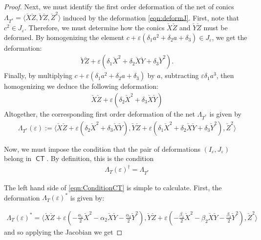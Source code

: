 \documentclass[reqno, 11pt]{amsart}
\theoremstyle{plain}
\theoremstyle{remark}
\DeclareMathOperator{\CT}{\mathsf{CT}}
\begin{document}
\begin{proof}
Next, we must identify the first order deformation of the net of
conics $\Lambda_{T^{*}} = \langle \check{X}\check{Z}, \check{Y}\check{Z}, \check{Z}^{2} \rangle$ induced by
the deformation \eqref{eqn:deformJ}.  First, note that
$c^{2} \in J_{\varepsilon}$. Therefore, we must determine how the
conics $\check{X}\check{Z}$ and $\check{Y}\check{Z}$ must be deformed.  By homogenizing the element
$c + \varepsilon(\delta_{1}a^{2}+\delta_{2}a + \delta_{3}) \in
J_{\varepsilon}$, we get the deformation:
\begin{eqnarray*}
  \check{Y}\check{Z} + \varepsilon(\delta_{1}\check{X}^{2}+\delta_{2}\check{X}\check{Y} + \delta_{3}\check{Y}^{2}).
\end{eqnarray*}
Finally, by multiplying
$c + \varepsilon(\delta_{1}a^{2}+\delta_{2}a + \delta_{3})$ by $a$,
subtracting $\varepsilon \delta_{1} a^{3}$, then homogenizing we
deduce the following deformation:
\begin{eqnarray*}
  \check{X}\check{Z} + \varepsilon(\delta_{2}\check{X}^{2} + \delta_{3}\check{X}\check{Y})
\end{eqnarray*} Altogether, the corresponding first order deformation of the net $\Lambda_{T^{*}}$ is given by  
\begin{eqnarray}
  \label{deformLambdaprime}
  \Lambda_{T^{*}}(\varepsilon) := \langle \check{X}\check{Z} + \varepsilon(\delta_{2}\check{X}^{2} + \delta_{3}\check{X}\check{Y}), \check{Y}\check{Z} + \varepsilon(\delta_{1}\check{X}^{2}+\delta_{2}\check{X}\check{Y} + \delta_{3}\check{Y}^{2}), \check{Z}^{2} \rangle 
\end{eqnarray}

Now, we must impose the condition that the pair of deformations
$(I_{\varepsilon}, J_{\varepsilon})$ belong in $\CT$. By definition,
this is the condition
\begin{eqnarray}\label{eqn:ConditionCT}
  \Lambda_{T}(\varepsilon)^{\dagger} = \Lambda_{T^{*}}
\end{eqnarray}


The left hand side of \eqref{eqn:ConditionCT} is simple to calculate.  First, the deformation $\Lambda_{T}(\varepsilon)^{*}$ is given by: 

\begin{eqnarray*}
  \Lambda_{T}(\varepsilon)^{*} = \langle \check{X}\check{Z} + \varepsilon(-\frac{\alpha_{1}}{2} \check{X}^{2} - \alpha_{2}\check{X}\check{Y} - \frac{\alpha_{3}}{2} \check{Y}^{2}), \check{Y}\check{Z} + \varepsilon(-\frac{\beta_{1}}{2} \check{X}^{2}-\beta_{2}\check{X}\check{Y} - \frac{\beta_{3}}{2} \check{Y}^{2}), \check{Z}^{2} \rangle
\end{eqnarray*}
and so applying the Jacobian we get 


\end{proof}
\end{document}
